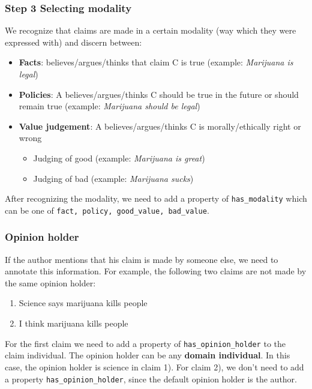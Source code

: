 \subsubsection{Step 3 Selecting modality}

We recognize that claims are made in a certain modality (way which they were
expressed with) and discern between:

\begin{itemize}
\item \textbf{Facts}:  believes/argues/thinks that claim C is true (example:
	\textit{Marijuana is legal})
\item \textbf{Policies}: A believes/argues/thinks C should be true in the
	future or should remain true  (example: \textit{Marijuana should be legal}) 
\item \textbf{Value judgement}: A believes/argues/thinks C is morally/ethically
	right or wrong
	\begin{itemize}
	\item Judging of good (example: \textit{Marijuana is great})
	\item Judging of bad (example: \textit{Marijuana sucks})
	\end{itemize}
\end{itemize}
After recognizing the modality, we need to add a property of \texttt{has\_modality} which
can be one of \texttt{fact, policy, good\_value, bad\_value}. 

\subsubsection{Opinion holder}

If the author mentions that his claim is made by someone else, we need to
annotate this information. For example, the following two claims are not made
by the same opinion holder:

\begin{enumerate}
\item Science says marijuana kills people
\item I think marijuana kills people
\end{enumerate}
For the first claim we need to add a property of \texttt{has\_opinion\_holder} to the
claim individual. The opinion holder can be any \textbf{domain individual}. In this
case, the opinion holder is science in claim 1). For claim 2), we don't need to
add a property \texttt{has\_opinion\_holder}, since the default opinion holder is the
author. 


